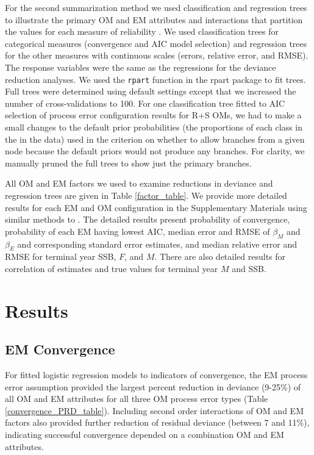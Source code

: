 \documentclass[
  12pt,
]{article}
\begin{document}
For the second summarization method we used classification and regression trees \citep{breimanetal84} to illustrate the primary OM and EM attributes and interactions that partition the values for each measure of reliability \citep[e.g.,][]{gonzalezetal18, collieretal22}. We used classification trees for categorical measures (convergence and AIC model selection) and regression trees for the other measures with continuous scales (errors, relative error, and RMSE). The response variables were the same as the regressions for the deviance reduction analyses. We used the \verb|rpart| function in the rpart package \citep{rpart} to fit trees. Full trees were determined using default settings except that we increased the number of cross-validations to 100. For one classification tree fitted to AIC selection of process error configuration results for R+S OMs, we had to make a small changes to the default prior probabilities (the proportions of each class in the in the data) used in the criterion on whether to allow branches from a given node because the default priors would not produce any branches. For clarity, we manually pruned the full trees to show just the primary branches.

All OM and EM factors we used to examine reductions in deviance and regression trees are given in Table \ref{factor_table}. We provide more detailed results for each EM and OM configuration in the Supplementary Materials using similar methods to \citet{milleretal_inreview1}. The detailed results present probability of convergence, probability of each EM having lowest AIC, median error and RMSE of \(\beta_M\) and \(\beta_E\) and corresponding standard error estimates, and median relative error and RMSE for terminal year SSB, \(F\), and \(M\). There are also detailed results for correlation of estimates and true values for terminal year \(M\) and SSB.

\section*{Results}\label{results}

\subsection*{EM Convergence}\label{em-convergence-1}

For fitted logistic regression models to indicators of convergence, the EM process error assumption provided the largest percent reduction in deviance (9-25\%) of all OM and EM attributes for all three OM process error types (Table \ref{convergence_PRD_table}). Including second order interactions of OM and EM factors also provided further reduction of residual deviance (between 7 and 11\%), indicating successful convergence depended on a combination OM and EM attributes.
\end{document}
